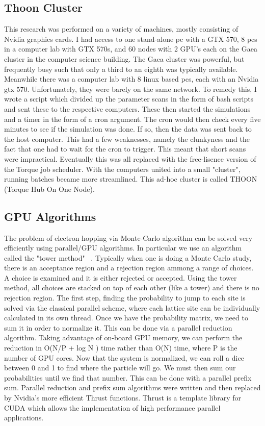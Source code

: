 \subsection{Thoon Cluster}
This research was performed on a variety of machines, mostly consisting of Nvidia graphics cards. I had access to one stand-alone pc with a GTX 570, 8 pcs in a computer lab with GTX 570s, and 60 nodes with 2 GPU's each on the Gaea cluster in the computer science building. The Gaea cluster was powerful, but frequently busy such that only a third to an eighth was typically available. Meanwhile there was a computer lab with 8 linux based pcs, each with an Nvidia gtx 570. Unfortunately, they were barely on the same network. To remedy this, I wrote a script which divided up the parameter scans in the form of bash scripts and sent these to the respective computers. These then started the simulations and a timer in the form of a cron argument. The cron would then check every five minutes to see if the simulation was done. If so, then the data was sent back to the host computer. This had a few weaknesses, namely the clunkyness and the fact that one had to wait for the cron to trigger. This meant that short scans were impractical. Eventually this was all replaced with the free-lisence version of the Torque job scheduler. With the computers united into a small "cluster", running batches became more streamlined. This ad-hoc cluster is called THOON (Torque Hub On One Node).

\subsection{GPU Algorithms}
The problem of electron hopping via Monte-Carlo algorithm can be solved very efficiently using parallel/GPU algorithms. In particular we use an algorithm called the "tower method" ~\cite{Krauth06}. Typically when one is doing a Monte Carlo study, there is an acceptance region and a rejection region ammong a range of choices. A choice is examined and it is either rejected or accepted. Using the tower method, all choices are stacked on top of each other (like a tower) and there is no rejection region. The first step, finding the probability to jump to each site is solved via the classical parallel scheme, where each lattice site can be individually calculated in its own thread. Once we have the probability matrix, we need to sum it in order to normalize it. This can be done via a parallel reduction algorithm. Taking advantage of on-board GPU memory, we can perform the reduction in O(N/P + log N ) time rather than O(N) time, where P is the number of GPU cores. Now that the system is normalized, we can roll a dice between 0 and 1 to find where the particle will go. We must then sum our probabilities until we find that number. This can be done with a parallel prefix sum. Parallel reduction and prefix sum algorithms were written and then replaced by Nvidia's more efficient Thrust functions. Thrust is a template library for CUDA which allows the implementation of high performance parallel applications.

